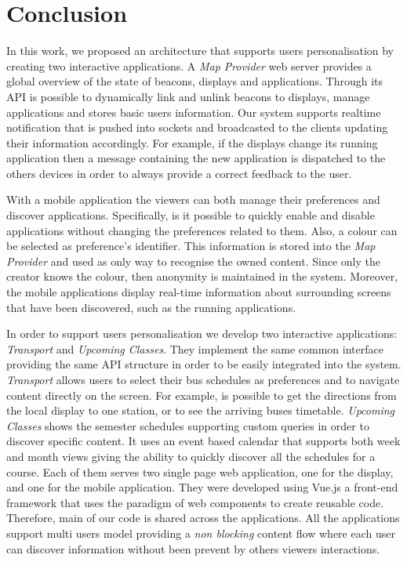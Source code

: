 \documentclass[]{usiinfbachelorproject}
\begin{document}
\section{Conclusion}
In this work, we proposed an architecture that supports users personalisation by creating two interactive applications. A \emph{Map Provider} web server provides a global overview of the state of beacons, displays and applications. Through its API is possible to dynamically link and unlink beacons to displays, manage applications and stores basic users information. Our system supports realtime notification that is pushed into sockets and broadcasted to the clients updating their information accordingly. For example, if the displays change its running application then a message containing the new application is dispatched to the others devices in order to always provide a correct feedback to the user.

With a mobile application the viewers can both manage their preferences and discover applications. Specifically, is it possible to quickly enable and disable applications without changing the preferences related to them. Also, a colour can be selected as preference's identifier. This information is stored into the \emph{Map Provider} and used as only way to recognise the owned content. Since only the creator knows the colour, then anonymity is maintained in the system.
Moreover, the mobile applications display real-time information about surrounding screens that have been discovered, such as the running applications.

In order to support users personalisation we develop two interactive applications: \emph{Transport} and \emph{Upcoming Classes}.
They implement the same common interface providing the same API structure in order to be easily integrated into the system. 
\emph{Transport} allows users to select their bus schedules as preferences and to navigate content directly on the screen. For example, is possible to get the directions from the local display to one station, or to see the arriving buses timetable.
\emph{Upcoming Classes} shows the semester schedules supporting custom queries in order to discover specific content. It uses an event based calendar that supports both week and month views giving the ability to quickly discover all the schedules for a course. Each of them serves two single page web application, one for the display, and one for the mobile application. They were developed using Vue.js a front-end framework that uses the paradigm of web components to create reusable code. Therefore, main of our code is shared across the applications.
All the applications support multi users model providing a \emph{non blocking} content flow where each user can discover information without been prevent by others viewers interactions. 
\end{document}
